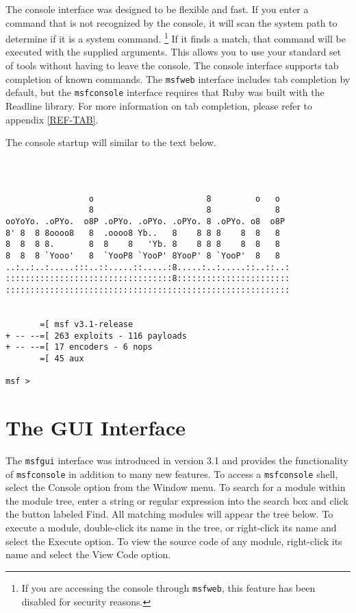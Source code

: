 \documentclass{report}
\begin{document}
\par
The console interface was designed to be flexible and fast. If you
enter a command that is not recognized by the console, it will scan the system
path to determine if it is a system command. \footnote{If you are accessing the console
through \texttt{msfweb}, this feature has been disabled for security reasons.}
If it finds a match, that command will be executed with the supplied arguments. This allows you to use
your standard set of tools without having to leave the console. The console interface
supports tab completion of known commands. The \texttt{msfweb} interface
includes tab completion by default, but the \texttt{msfconsole} interface requires that 
Ruby was built with the Readline library. For more information on tab completion, please
refer to appendix \ref{REF-TAB}.

\par
The console startup will similar to the text below.

\begin{verbatim}



                 o                       8         o   o
                 8                       8             8
ooYoYo. .oPYo.  o8P .oPYo. .oPYo. .oPYo. 8 .oPYo. o8  o8P
8' 8  8 8oooo8   8  .oooo8 Yb..   8    8 8 8    8  8   8
8  8  8 8.       8  8    8   'Yb. 8    8 8 8    8  8   8
8  8  8 `Yooo'   8  `YooP8 `YooP' 8YooP' 8 `YooP'  8   8
..:..:..:.....:::..::.....::.....:8.....:..:.....::..::..:
::::::::::::::::::::::::::::::::::8:::::::::::::::::::::::
::::::::::::::::::::::::::::::::::::::::::::::::::::::::::


       =[ msf v3.1-release
+ -- --=[ 263 exploits - 116 payloads
+ -- --=[ 17 encoders - 6 nops
       =[ 45 aux

msf >            
\end{verbatim}

    \section{The GUI Interface}
    \label{STARTED-GUI}

\par
The \texttt{msfgui} interface was introduced in version 3.1 and provides the functionality
of \texttt{msfconsole} in addition to many new features. To access a \texttt{msfconsole}
shell, select the Console option from the Window menu. To search for a module within the
module tree, enter a string or regular expression into the search box and click the button
labeled Find. All matching modules will appear the tree below. To execute a module, 
double-click its name in the tree, or right-click its name and select the Execute option.
To view the source code of any module, right-click its name and select the View Code option.
\end{document}
